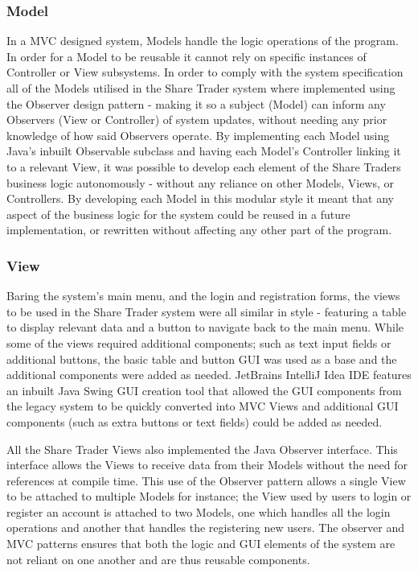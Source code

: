 \documentclass[12pt, a4paper,titlepage]{article}
\begin{document}
\subsubsection{Model}
In a MVC designed system, Models handle the logic operations of the program.
In order for a Model to be reusable it cannot rely on specific instances of
Controller or View subsystems. 
In order to comply with the system specification all of the Models utilised in
the Share Trader system where implemented using the Observer design pattern -
making it so a subject (Model) can inform any Observers (View or Controller)
of system updates, without needing any prior knowledge of how said Observers
operate.  
By implementing each Model using Java’s inbuilt Observable subclass and having
each Model’s Controller linking it to a relevant View, it was possible to
develop each element of the Share Traders business logic autonomously -
without any reliance on other Models, Views, or Controllers.
By developing each Model in this modular style it meant that any aspect of the
business logic for the system could be reused in a future implementation, or
rewritten without affecting any other part of the program.

\subsubsection{View}
Baring the system's main menu, and the login and registration forms, the views
to be used in the Share Trader system were all similar in style - featuring a
table to display relevant data and a button to navigate back to the main menu.
While some of the views required additional components; such as text input
fields or additional buttons, the basic table and button GUI was used as a
base and the additional components were added as needed.  
JetBrains IntelliJ Idea IDE features an inbuilt Java Swing GUI creation tool
that allowed the GUI components from the legacy system to be quickly converted
into MVC Views and additional GUI components (such as extra buttons or text
fields) could be added as needed.

All the Share Trader Views also implemented the Java Observer interface. 
This interface allows the Views to receive data from their Models without the
need for references at compile time. 
This use of the Observer pattern allows a single View to be attached to
multiple Models for instance; the View used by users to login or register an
account is attached to two Models, one which handles all the login operations
and another that handles the registering new users. 
The observer and MVC patterns ensures that both the logic and GUI elements of
the system are not reliant on one another and are thus reusable components.
\end{document}

